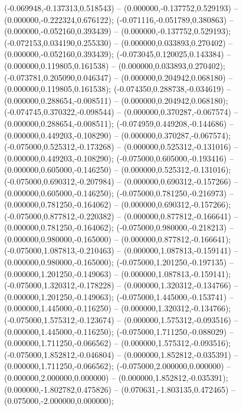  (-0.069948,-0.137313,0.518543) -- (0.000000,-0.137752,0.529193) -- (0.000000,-0.222324,0.676122);
 (-0.071116,-0.051789,0.380863) -- (0.000000,-0.052160,0.393439) -- (0.000000,-0.137752,0.529193);
 (-0.072153,0.034190,0.255330) -- (0.000000,0.033893,0.270402) -- (0.000000,-0.052160,0.393439);
 (-0.073045,0.120025,0.143384) -- (0.000000,0.119805,0.161538) -- (0.000000,0.033893,0.270402);
 (-0.073781,0.205090,0.046347) -- (0.000000,0.204942,0.068180) -- (0.000000,0.119805,0.161538);
 (-0.074350,0.288738,-0.034619) -- (0.000000,0.288654,-0.008511) -- (0.000000,0.204942,0.068180);
 (-0.074745,0.370322,-0.098544) -- (0.000000,0.370287,-0.067574) -- (0.000000,0.288654,-0.008511);
 (-0.074959,0.449208,-0.144686) -- (0.000000,0.449203,-0.108290) -- (0.000000,0.370287,-0.067574);
 (-0.075000,0.525312,-0.173268) -- (0.000000,0.525312,-0.131016) -- (0.000000,0.449203,-0.108290);
 (-0.075000,0.605000,-0.193416) -- (0.000000,0.605000,-0.146250) -- (0.000000,0.525312,-0.131016);
 (-0.075000,0.690312,-0.207984) -- (0.000000,0.690312,-0.157266) -- (0.000000,0.605000,-0.146250);
 (-0.075000,0.781250,-0.216973) -- (0.000000,0.781250,-0.164062) -- (0.000000,0.690312,-0.157266);
 (-0.075000,0.877812,-0.220382) -- (0.000000,0.877812,-0.166641) -- (0.000000,0.781250,-0.164062);
 (-0.075000,0.980000,-0.218213) -- (0.000000,0.980000,-0.165000) -- (0.000000,0.877812,-0.166641);
 (-0.075000,1.087813,-0.210463) -- (0.000000,1.087813,-0.159141) -- (0.000000,0.980000,-0.165000);
 (-0.075000,1.201250,-0.197135) -- (0.000000,1.201250,-0.149063) -- (0.000000,1.087813,-0.159141);
 (-0.075000,1.320312,-0.178228) -- (0.000000,1.320312,-0.134766) -- (0.000000,1.201250,-0.149063);
 (-0.075000,1.445000,-0.153741) -- (0.000000,1.445000,-0.116250) -- (0.000000,1.320312,-0.134766);
 (-0.075000,1.575312,-0.123674) -- (0.000000,1.575312,-0.093516) -- (0.000000,1.445000,-0.116250);
 (-0.075000,1.711250,-0.088029) -- (0.000000,1.711250,-0.066562) -- (0.000000,1.575312,-0.093516);
 (-0.075000,1.852812,-0.046804) -- (0.000000,1.852812,-0.035391) -- (0.000000,1.711250,-0.066562);
 (-0.075000,2.000000,0.000000) -- (0.000000,2.000000,0.000000) -- (0.000000,1.852812,-0.035391);
 (0.000000,-1.802782,0.475826) -- (0.070631,-1.803135,0.472465) -- (0.075000,-2.000000,0.000000);
